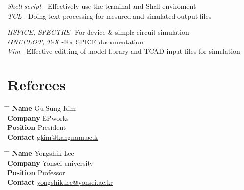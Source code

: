 \documentclass[10pt]{article} %
\begin{document}
{
\textit{Shell script}  - Effectively use the terminal and Shell enviroment \\
\textit{TCL} - Doing text processing for mesured and simulated output files\\
}


{
\textit{HSPICE, SPECTRE} -For device \& simple circuit simulation \\
\textit{GNUPLOT, TeX} -For SPICE documentation \\
\textit{Vim} - Effective editting of model library and TCAD input files for simulation\\
}


\section{Referees}

\parbox{0.5\textwidth}{ %
\begin{tabbing}
\hspace{2.75cm} \= \hspace{4cm} \= \kill %
{\bf Name} \> Gu-Sung Kim \\ %
{\bf Company} \> EPworks \\ %
{\bf Position} \> President \\ %
{\bf Contact} \> \href{mailto:gkim@kangnam.ac.kr}{gkim@kangnam.ac.k} %
\end{tabbing}}
\hfill %
\parbox{0.5\textwidth}{ %
\begin{tabbing}
\hspace{2.75cm} \= \hspace{4cm} \= \kill %
{\bf Name} \> Yongshik Lee\\ %
{\bf Company} \> Yonsei university \\ %
{\bf Position} \> Professor \\ %
{\bf Contact} \> \href{mailto:yongshik.lee@yonsei.ac.kr}{yongshik.lee@yonsei.ac.kr} %
\end{tabbing}}

\end{document}

